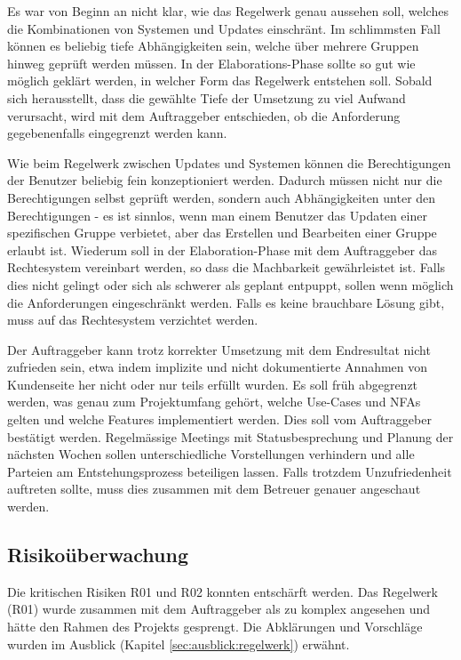 {Es war von Beginn an nicht klar, wie das Regelwerk genau aussehen soll, welches die Kombinationen von Systemen und Updates einschränt. Im schlimmsten Fall können es beliebig tiefe Abhängigkeiten sein, welche über mehrere Gruppen hinweg geprüft werden müssen.}
{In der Elaborations-Phase sollte so gut wie möglich geklärt werden, in welcher Form das Regelwerk entstehen soll. Sobald sich herausstellt, dass die gewählte Tiefe der Umsetzung zu viel Aufwand verursacht, wird mit dem Auftraggeber entschieden, ob die Anforderung gegebenenfalls eingegrenzt werden kann.}


{Wie beim Regelwerk zwischen Updates und Systemen können die Berechtigungen der Benutzer beliebig fein konzeptioniert werden. Dadurch müssen nicht nur die Berechtigungen selbst geprüft werden, sondern auch Abhängigkeiten unter den Berechtigungen - es ist sinnlos, wenn man einem Benutzer das Updaten einer spezifischen Gruppe verbietet, aber das Erstellen und Bearbeiten einer Gruppe erlaubt ist.}
{Wiederum soll in der Elaboration-Phase mit dem Auftraggeber das Rechtesystem vereinbart werden, so dass die Machbarkeit gewährleistet ist. Falls dies nicht gelingt oder sich als schwerer als geplant entpuppt, sollen wenn möglich die Anforderungen eingeschränkt werden. Falls es keine brauchbare Lösung gibt, muss auf das Rechtesystem verzichtet werden.}


{Der Auftraggeber kann trotz korrekter Umsetzung mit dem Endresultat nicht zufrieden sein, etwa indem implizite und nicht dokumentierte Annahmen von Kundenseite her nicht oder nur teils erfüllt wurden.}
{Es soll früh abgegrenzt werden, was genau zum Projektumfang gehört, welche Use-Cases und NFAs gelten und welche Features implementiert werden. Dies soll vom Auftraggeber bestätigt werden. Regelmässige Meetings mit Statusbesprechung und Planung der nächsten Wochen sollen unterschiedliche Vorstellungen verhindern und alle Parteien am Entstehungsprozess beteiligen lassen. Falls trotzdem Unzufriedenheit auftreten sollte, muss dies zusammen mit dem Betreuer genauer angeschaut werden.}

\subsection*{Risikoüberwachung}

Die kritischen Risiken R01 und R02 konnten entschärft werden. Das Regelwerk (R01) wurde zusammen mit dem Auftraggeber als zu komplex angesehen und hätte den Rahmen des Projekts gesprengt. Die Abklärungen und Vorschläge wurden im Ausblick (Kapitel \ref{sec:ausblick:regelwerk}) erwähnt.

